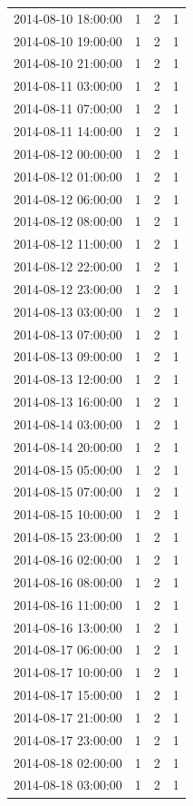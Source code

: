 \begin{tabular}{lrrr}
2014-08-10 18:00:00 & 1 & 2 & 1 \\
2014-08-10 19:00:00 & 1 & 2 & 1 \\
2014-08-10 21:00:00 & 1 & 2 & 1 \\
2014-08-11 03:00:00 & 1 & 2 & 1 \\
2014-08-11 07:00:00 & 1 & 2 & 1 \\
2014-08-11 14:00:00 & 1 & 2 & 1 \\
2014-08-12 00:00:00 & 1 & 2 & 1 \\
2014-08-12 01:00:00 & 1 & 2 & 1 \\
2014-08-12 06:00:00 & 1 & 2 & 1 \\
2014-08-12 08:00:00 & 1 & 2 & 1 \\
2014-08-12 11:00:00 & 1 & 2 & 1 \\
2014-08-12 22:00:00 & 1 & 2 & 1 \\
2014-08-12 23:00:00 & 1 & 2 & 1 \\
2014-08-13 03:00:00 & 1 & 2 & 1 \\
2014-08-13 07:00:00 & 1 & 2 & 1 \\
2014-08-13 09:00:00 & 1 & 2 & 1 \\
2014-08-13 12:00:00 & 1 & 2 & 1 \\
2014-08-13 16:00:00 & 1 & 2 & 1 \\
2014-08-14 03:00:00 & 1 & 2 & 1 \\
2014-08-14 20:00:00 & 1 & 2 & 1 \\
2014-08-15 05:00:00 & 1 & 2 & 1 \\
2014-08-15 07:00:00 & 1 & 2 & 1 \\
2014-08-15 10:00:00 & 1 & 2 & 1 \\
2014-08-15 23:00:00 & 1 & 2 & 1 \\
2014-08-16 02:00:00 & 1 & 2 & 1 \\
2014-08-16 08:00:00 & 1 & 2 & 1 \\
2014-08-16 11:00:00 & 1 & 2 & 1 \\
2014-08-16 13:00:00 & 1 & 2 & 1 \\
2014-08-17 06:00:00 & 1 & 2 & 1 \\
2014-08-17 10:00:00 & 1 & 2 & 1 \\
2014-08-17 15:00:00 & 1 & 2 & 1 \\
2014-08-17 21:00:00 & 1 & 2 & 1 \\
2014-08-17 23:00:00 & 1 & 2 & 1 \\
2014-08-18 02:00:00 & 1 & 2 & 1 \\
2014-08-18 03:00:00 & 1 & 2 & 1 \\

\end{tabular}
